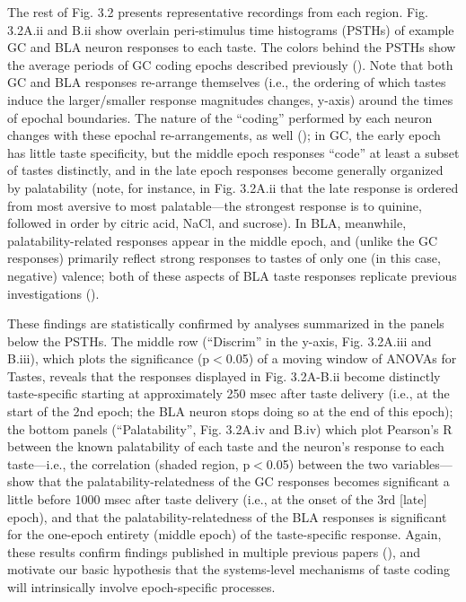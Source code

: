 \begin{refsection}
The rest of Fig. 3.2 presents representative recordings from each region. Fig. 3.2A.ii and B.ii show overlain peri-stimulus time histograms (PSTHs) of example GC and BLA neuron responses to each taste. The colors behind the PSTHs show the average periods of GC coding epochs described previously (\cite{katz2001a,fontanini2009a,sadacca2012a}). Note that both GC and BLA responses re-arrange themselves (i.e., the ordering of which tastes induce the larger/smaller response magnitudes changes, y-axis) around the times of epochal boundaries. The nature of the “coding” performed by each neuron changes with these epochal re-arrangements, as well (\cite{katz2001a,sadacca2012a,moran2014a,li2016a}); in GC, the early epoch has little taste specificity, but the middle epoch responses “code” at least a subset of tastes distinctly, and in the late epoch responses become generally organized by palatability (note, for instance, in Fig. 3.2A.ii that the late response is ordered from most aversive to most palatable—the strongest response is to quinine, followed in order by citric acid, NaCl, and sucrose). In BLA, meanwhile, palatability-related responses appear in the middle epoch, and (unlike the GC responses) primarily reflect strong responses to tastes of only one (in this case, negative) valence; both of these aspects of BLA taste responses replicate previous investigations (\cite{fontanini2009a}).

These findings are statistically confirmed by analyses summarized in the panels below the PSTHs. The middle row (“Discrim” in the y-axis, Fig. 3.2A.iii and B.iii), which plots the significance (p\(<\)0.05) of a moving window of ANOVAs for Tastes, reveals that the responses displayed in Fig. 3.2A-B.ii become distinctly taste-specific starting at approximately 250 msec after taste delivery (i.e., at the start of the 2nd epoch; the BLA neuron stops doing so at the end of this epoch); the bottom panels (“Palatability”, Fig. 3.2A.iv and B.iv) which plot Pearson’s R between the known palatability of each taste and the neuron’s response to each taste—i.e., the correlation (shaded region, p\(<\)0.05) between the two variables—show that the palatability-relatedness of the GC responses becomes significant a little before 1000 msec after taste delivery (i.e., at the onset of the 3rd [late] epoch), and that the palatability-relatedness of the BLA responses is significant for the one-epoch  entirety (middle epoch) of the taste-specific response. Again, these results confirm findings published in multiple previous papers (\cite{katz2001a,grossman2008a,fontanini2009a,sadacca2012a}), and motivate our basic hypothesis that the systems-level mechanisms of taste coding will intrinsically involve epoch-specific processes.


\end{refsection}

